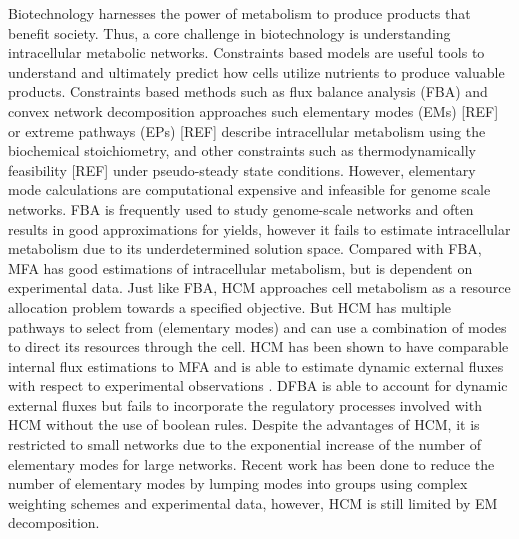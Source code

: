 \documentclass[10pt,twocolumn,twoside,final]{IEEEtran}
\begin{document}
Biotechnology harnesses the power of metabolism to produce products that benefit society.
Thus, a core challenge in biotechnology is understanding intracellular metabolic networks.
Constraints based models are useful tools to understand and ultimately predict how cells utilize nutrients to produce valuable products.
Constraints based methods such as flux balance analysis (FBA) \cite{2010_orth_NatBiotech} and convex network decomposition approaches such elementary modes (EMs) [REF] or extreme pathways (EPs) [REF] describe intracellular metabolism using the biochemical stoichiometry, and other constraints such as thermodynamically feasibility [REF]
under pseudo-steady state conditions.
However, elementary mode calculations are computational expensive and infeasible for genome scale networks\cite{2004_lee_varner_ko_ieee}.
FBA is frequently used to study genome-scale networks and often results in good approximations for yields, however it fails to estimate intracellular metabolism due to its underdetermined solution space.
Compared with FBA, MFA has good estimations of intracellular metabolism, but is dependent on experimental data.
Just like FBA, HCM approaches cell metabolism as a resource allocation problem towards a specified objective.
But HCM has multiple pathways to select from (elementary modes) and can use a combination of modes to direct its resources through the cell.
HCM has been shown to have comparable internal flux estimations to MFA and is able to estimate dynamic external fluxes with respect to experimental observations \cite{2008_kim_varner_ramkrishna_BiotechProg}.
DFBA is able to account for dynamic external fluxes but fails to incorporate the regulatory processes involved with HCM without the use of boolean rules\cite{2001_covert_schilling_palsson}.
Despite the advantages of HCM, it is restricted to small networks due to the exponential increase of the number of elementary modes for large networks.
Recent work has been done to reduce the number of elementary modes by lumping modes into groups using complex weighting schemes and experimental data\cite{2010_song_ramkrishna}, however, HCM is still limited by EM decomposition.
\end{document}
